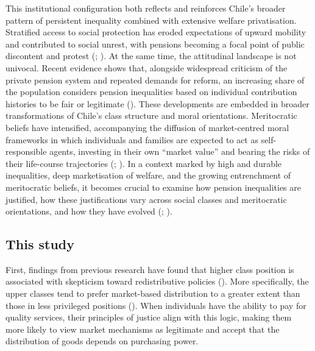 \documentclass[
  12pt,
]{article}
\begin{document}
This institutional configuration both reflects and reinforces Chile's
broader pattern of persistent inequality combined with extensive welfare
privatisation. Stratified access to social protection has eroded
expectations of upward mobility and contributed to social unrest, with
pensions becoming a focal point of public discontent and protest
(;
).
At the same time, the attitudinal landscape is not univocal. Recent
evidence shows that, alongside widespread criticism of the private
pension system and repeated demands for reform, an increasing share of
the population considers pension inequalities based on individual
contribution histories to be fair or legitimate
(). These developments are embedded in broader transformations of
Chile's class structure and moral orientations. Meritocratic beliefs
have intensified, accompanying the diffusion of market-centred moral
frameworks in which individuals and families are expected to act as
self-responsible agents, investing in their own ``market value'' and
bearing the risks of their life-course trajectories
(;
). In a context marked by
high and durable inequalities, deep marketisation of welfare, and the
growing entrenchment of meritocratic beliefs, it becomes crucial to
examine how pension inequalities are justified, how these justifications
vary across social classes and meritocratic orientations, and how they
have evolved (; ).

\subsection{This study}\label{this-study}

First, findings from previous research have found that higher class
position is associated with skepticism toward redistributive policies
(). More
specifically, the upper classes tend to prefer market-based distribution
to a greater extent than those in less privileged positions
(). When individuals have
the ability to pay for quality services, their principles of justice
align with this logic, making them more likely to view market mechanisms
as legitimate and accept that the distribution of goods depends on
purchasing power.
\end{document}
